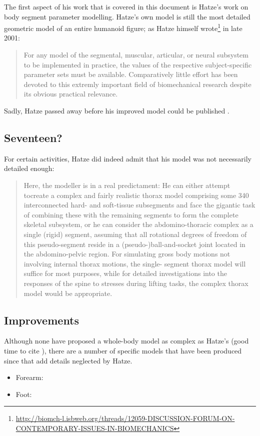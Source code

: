 \documentclass[a4paper]{article}
\begin{document}
The first aspect of his work that is covered in this document is Hatze's work on body segment parameter modelling.
Hatze's own model \parencite{hatze1979-techreport} is still the most detailed geometric model of an entire humanoid figure; as Hatze himself wrote\footnote{\url{http://biomch-l.isbweb.org/threads/12059-DISCUSSION-FORUM-ON-CONTEMPORARY-ISSUES-IN-BIOMECHANICS}} in late 2001:
\begin{quote}
For any model of the segmental, muscular, articular, or neural subsystem
to be implemented in practice, the values of the respective
subject-specific parameter sets must be available.
Comparatively little
effort has been devoted to this extremly important field of
biomechanical research despite its obvious practical relevance.
\end{quote}
Sadly, Hatze passed away before his improved model could be published \parencite{hatze2005-ties-bsm}.

\subsection{Seventeen?}

For certain activities, Hatze did indeed admit that his model was not necessarily detailed enough:
\begin{quote}
Here, the modeller is in a real predictament: He can either attempt tocreate a complex and fairly realistic thorax model comprising some 340 interconnected hard- and soft-tissue subsegments and face the gigantic task of combining these with the remaining segments to form the complete skeletal subsystem, or he can consider the abdomino-thoracic complex as a single (rigid) segment, assuming that all rotational degrees of freedom of this pseudo-segment reside in a (pseudo-)ball-and-socket joint located in the abdomino-pelvic region. For simulating gross body motions not involving internal thorax motions, the single- segment thorax model will suffice for most purposes, while for detailed investigations into the responses of the spine to stresses during lifting tasks, the complex thorax model would be appropriate.
\parencite{hatze1998-bio-sports}
\end{quote}

\subsection{Improvements}

Although none have proposed a whole-body model as complex as Hatze's (good time to cite \textcite{kwon1996-jab}), there are a number of specific models that have been produced since that add details neglected by Hatze.
\begin{itemize}
  \item Forearm: \textcite{reich2000-biomech}
  \item Foot: \textcite{dillon2001-thesis}
\end{itemize}
\end{document}
